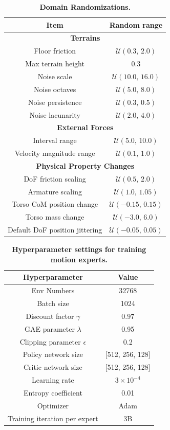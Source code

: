 \begin{table}[t!]
    \centering
    \caption{\textbf{Domain Randomizations.}}
    \label{tab:dr_items}
    \begin{tabular}{cc}
    \toprule
    Item & Random range \\
    \midrule
    \multicolumn{2}{c}{\textbf{Terrains}} \\
    Floor friction & $\mathcal{U}(0.3,\, 2.0)$ \\
    Max terrain height & $0.3$ \\
    Noise scale & $\mathcal{U}(10.0,\, 16.0)$ \\
    Noise octaves & $\mathcal{U}(5.0,\, 8.0)$ \\
    Noise persistence & $\mathcal{U}(0.3,\, 0.5)$ \\
    Noise lacunarity & $\mathcal{U}(2.0,\, 4.0)$ \\
    \midrule
    \multicolumn{2}{c}{\textbf{External Forces}} \\
    Interval range & $\mathcal{U}(5.0,\, 10.0)$ \\
    Velocity magnitude range & $\mathcal{U}(0.1,\, 1.0)$ \\
    \midrule
    \multicolumn{2}{c}{\textbf{Physical Property Changes}} \\
    DoF friction scaling & $\mathcal{U}(0.5,\, 2.0)$ \\
    Armature scaling & $\mathcal{U}(1.0,\, 1.05)$ \\
    Torso CoM position change & $\mathcal{U}(-0.15,\, 0.15)$ \\
    Torso mass change & $\mathcal{U}(-3.0,\, 6.0)$ \\
    Default DoF position jittering & $\mathcal{U}(-0.05,\, 0.05)$ \\
    \bottomrule
    \end{tabular}
\end{table}


\begin{table}[t!]
    \centering
    \caption{\textbf{Hyperparameter settings for training motion experts.}}
    \label{tab:ppo_hyperparams}
    \begin{tabular}{cc}
    \toprule
    Hyperparameter & Value \\
    \midrule
    Env Numbers & 32768 \\
    Batch size & 1024 \\
    Discount factor $\gamma$ & 0.97 \\
    GAE parameter $\lambda$ & 0.95 \\
    Clipping parameter $\epsilon$ & 0.2 \\
    Policy network size & [512, 256, 128] \\
    Critic network size & [512, 256, 128] \\
    Learning rate & $3\times10^{-4}$ \\
    Entropy coefficient & 0.01 \\
    Optimizer & Adam \\
    Training iteration per expert & 3B \\
    \bottomrule
    \end{tabular}
\end{table}


